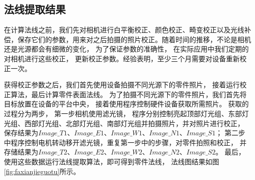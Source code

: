 \subsection{法线提取结果}

在计算法线之前，我们先对相机进行白平衡校正、颜色校正、畸变校正以及光线补偿，保存它们的参数，用来对之后拍摄的照片校正。随着时间的推移，不论是相机还是光源都会有细微的变化，
为了保证参数的准确性，
在实际应用中我们定期的对相机进行这些校正，
更新校正参数。经验表明，至少三个月需要对设备重新校正一次。

获得校正参数之后，我们首先使用设备拍摄不同光源下的零件照片，
接着运行校正算法，最后计算零件表面法线。
为了拍摄不同光源下的零件照片，我们首先将目标放置在设备的平台中央，
接着使用程序控制硬件设备获取所需照片。
获取的过程分为两步，
第一步相机使用滤光镜，
程序分别控制亮起顶部灯光组、东部灯光组、西部灯光组、北部灯光组、南部灯光组并拍摄照片，并对照片进行校正，
保存结果为$Image\_T1$、$Image\_E1$、$Image\_W1$、$Image\_N1$、$Image\_S1$；
第二步中程序控制电机转动移开滤光镜，重复第一步中的步骤，对零件拍照和校正，
并存储结果为$Image\_T2$、$Image\_E2$、$Image\_W2$、$Image\_N2$、$Image\_S2$。
最后，使用这些数据运行法线提取算法，即可得到零件法线，
法线图结果如图\ref{fig:faxianjieguotu}所示。

